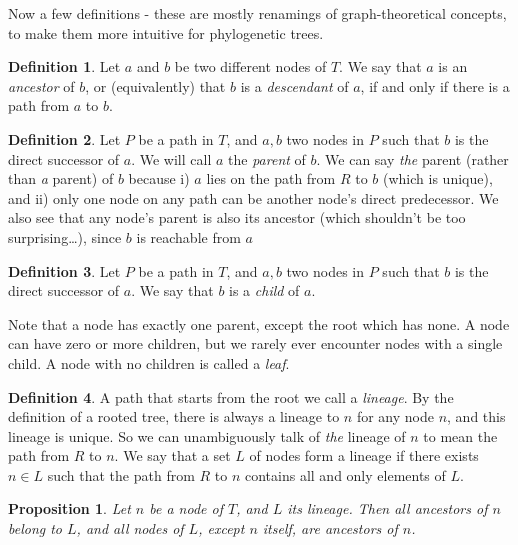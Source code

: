 \documentclass[a4paper,10pt]{report}
\newtheorem{prop}{Proposition}
\theoremstyle{definition}
\newtheorem{dfn}{Definition}
\begin{document}
Now a few definitions - these are mostly renamings of graph-theoretical concepts, to make them more intuitive for phylogenetic trees.

\begin{dfn}
\label{def_ancestor}
Let $a$ and $b$ be two different nodes of $T$. We say that $a$ is an \textit{ancestor} of $b$, or (equivalently) that $b$ is a \textit{descendant} of $a$, if and only if there is a path from $a$ to $b$. 
\end{dfn}

\begin{dfn}
\label{def_parent}
Let $P$ be a path in $T$, and $a, b$ two nodes in $P$ such that $b$ is the direct successor of $a$. We will call $a$ the \textit{parent} of $b$. We can say \textit{the} parent (rather than \textit{a} parent) of $b$ because i) $a$ lies on the path from $R$ to $b$ (which is unique), and ii) only one node on any path can be another node's direct predecessor. We also see that any node's parent is also its ancestor (which shouldn't be too surprising\ldots), since $b$ is reachable from $a$
\end{dfn}

\begin{dfn}
\label{def_child}
Let $P$ be a path in $T$, and $a, b$ two nodes in $P$ such that $b$ is the direct successor of $a$. We say that $b$ is a \textit{child} of $a$.
\end{dfn}

Note that a node has exactly one parent, except the root which has none. A node can have zero or more children, but we rarely ever encounter nodes with a single child. A node with no children is called a \textit{leaf}.

\begin{dfn}
\label{def_lineage}
A path that starts from the root we call a \emph{lineage}. By the definition of a rooted tree, there is always a lineage to $n$ for any node $n$, and this lineage is unique. So we can unambiguously talk of \textit{the} lineage of $n$ to mean the path from $R$ to $n$. We say that a set $L$ of nodes form a lineage if there exists $n \in L$ such that the path from $R$ to $n$ contains all and only elements of $L$.
\end{dfn}

\begin{prop}
\label{prop_lineage_ancestors_equivalence}
Let $n$ be a node of $T$, and $L$ its lineage. Then all ancestors of $n$ belong to $L$, and all nodes of $L$, except $n$ itself, are ancestors of $n$.
\end{prop}
\end{document}
